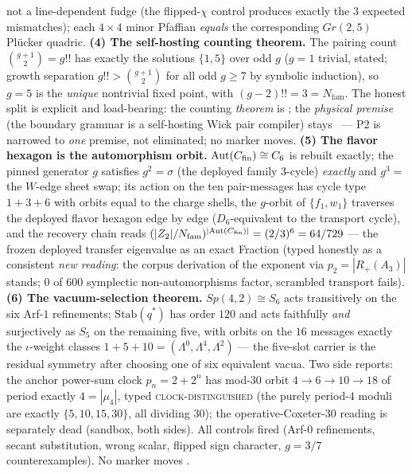 \documentclass[11pt,a4paper]{article}
\newcommand{\Nfam}{N_{\mathrm{fam}}}
\theoremstyle{definition}
\begin{document}
\begin{keybox}
not a line-dependent fudge (the flipped-$\chi$ control produces
exactly the $3$ expected mismatches); each $4\times4$ minor
Pfaffian \emph{equals} the corresponding $Gr(2,5)$ Pl\"ucker
quadric.  \textbf{(4) The self-hosting counting theorem.}  The
pairing count $\binom{g+1}{2} = g!!$ has exactly the solutions
$\{1, 5\}$ over odd $g$ ($g = 1$ trivial, stated; growth
separation $g!! > \binom{g+1}{2}$ for all odd $g \ge 7$ by
symbolic induction), so $g = 5$ is the \emph{unique} nontrivial
fixed point, with $(g-2)!! = 3 = \Nfam$.  The honest split is
explicit and load-bearing: the counting \emph{theorem} is \mE;
the \emph{physical premise} (the boundary grammar is a
self-hosting Wick pair compiler) stays \mO\ --- P2 is narrowed
to \emph{one} premise, not eliminated; no marker moves.
\textbf{(5) The flavor hexagon is the automorphism orbit.}
$\mathrm{Aut}(C_{\rm fin}) \cong C_6$ is rebuilt exactly; the
pinned generator $g$ satisfies $g^2 = \sigma$ (the deployed
family $3$-cycle) \emph{exactly} and $g^3 =$ the $W$-edge sheet
swap; its action on the ten pair-messages has cycle type $1 + 3
+ 6$ with orbits equal to the charge shells, the $g$-orbit of
$\{f_1, w_1\}$ traverses the deployed flavor hexagon edge by
edge ($D_6$-equivalent to the transport cycle), and the
recovery chain reads $(|Z_2|/\Nfam)^{|\mathrm{Aut}(C_{\rm
fin})|} = (2/3)^6 = 64/729$ --- the frozen deployed transfer
eigenvalue as an exact Fraction (typed honestly as a consistent
\emph{new reading}: the corpus derivation of the exponent via
$p_2 = |R_+(A_3)|$ stands; $0$ of $600$ symplectic
non-automorphisms factor, scrambled transport fails).
\textbf{(6) The vacuum-selection theorem.}  $Sp(4,2) \cong S_6$
acts transitively on the six Arf-$1$ refinements;
$\mathrm{Stab}(q^{*})$ has order $120$ and acts faithfully
\emph{and} surjectively as $S_5$ on the remaining five, with
orbits on the $16$ messages exactly the $\iota$-weight classes
$1 + 5 + 10 = (\Lambda^0, \Lambda^4, \Lambda^2)$ --- the
five-slot carrier is the residual symmetry after choosing one
of six equivalent vacua.  Two side reports: the anchor
power-sum clock $p_n = 2 + 2^n$ has mod-$30$ orbit $4 \to 6 \to
10 \to 18$ of period exactly $4 = |\mu_4|$, typed
\textsc{clock-distinguished} (the purely period-$4$ moduli are
exactly $\{5, 10, 15, 30\}$, all dividing $30$); the
operative-Coxeter-$30$ reading is separately dead (sandbox,
both sides).  All controls fired (Arf-$0$ refinements, secant
substitution, wrong scalar, flipped sign character, $g = 3/7$
counterexamples).  No marker moves \mE.
\end{keybox}
\end{document}
